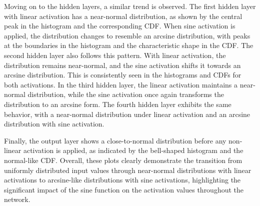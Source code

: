 \documentclass{ioereport}
\begin{document}
    Moving on to the hidden layers, a similar trend is observed. The first hidden layer with linear activation has a near-normal distribution, as shown by the central peak in the histogram and the corresponding CDF. When sine activation is applied, the distribution changes to resemble an arcsine distribution, with peaks at the boundaries in the histogram and the characteristic shape in the CDF. The second hidden layer also follows this pattern. With linear activation, the distribution remains near-normal, and the sine activation shifts it towards an arcsine distribution. This is consistently seen in the histograms and CDFs for both activations. In the third hidden layer, the linear activation maintains a near-normal distribution, while the sine activation once again transforms the distribution to an arcsine form. The fourth hidden layer exhibits the same behavior, with a near-normal distribution under linear activation and an arcsine distribution with sine activation.

    Finally, the output layer shows a close-to-normal distribution before any non-linear activation is applied, as indicated by the bell-shaped histogram and the normal-like CDF. Overall, these plots clearly demonstrate the transition from uniformly distributed input values through near-normal distributions with linear activations to arcsine-like distributions with sine activations, highlighting the significant impact of the sine function on the activation values throughout the network.
\end{document}
